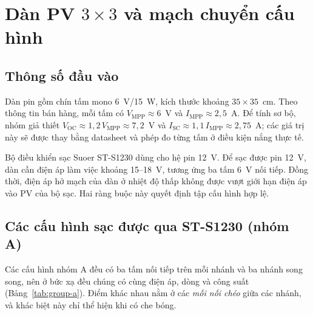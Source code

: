 \section{Dàn PV \texorpdfstring{\(3\times3\)}{3x3} và mạch chuyển cấu hình}
\label{sec:pv3x3}

\subsection{Thông số đầu vào}

Dàn pin gồm chín tấm mono 6~V/15~W, kích thước khoảng \(35\times35\)~cm. Theo thông tin bán hàng, mỗi tấm có \(V_{\mathrm{MPP}}\approx6\)~V và \(I_{\mathrm{MPP}}\approx2{,}5\)~A. Để tính sơ bộ, nhóm giả thiết \(V_{\mathrm{OC}}\approx1{,}2\,V_{\mathrm{MPP}}\approx7{,}2\)~V và \(I_{\mathrm{SC}}\approx1{,}1\,I_{\mathrm{MPP}}\approx2{,}75\)~A; các giá trị này sẽ được thay bằng datasheet và phép đo từng tấm ở điều kiện nắng thực tế.

Bộ điều khiển sạc Suoer ST-S1230 dùng cho hệ pin 12~V. Để sạc được pin 12~V, dàn cần điện áp làm việc khoảng 15--18~V, tương ứng ba tấm 6~V nối tiếp. Đồng thời, điện áp hở mạch của dàn ở nhiệt độ thấp không được vượt giới hạn điện áp vào PV của bộ sạc. Hai ràng buộc này quyết định tập cấu hình hợp lệ.

\subsection{Các cấu hình sạc được qua ST-S1230 (nhóm A)}
\label{sec:group-a}

Các cấu hình nhóm A đều có ba tấm nối tiếp trên mỗi nhánh và ba nhánh song song, nên ở bức xạ đều chúng có cùng điện áp, dòng và công suất (Bảng~\ref{tab:group-a}). Điểm khác nhau nằm ở các \emph{mối nối chéo} giữa các nhánh, và khác biệt này chỉ thể hiện khi có che bóng.

